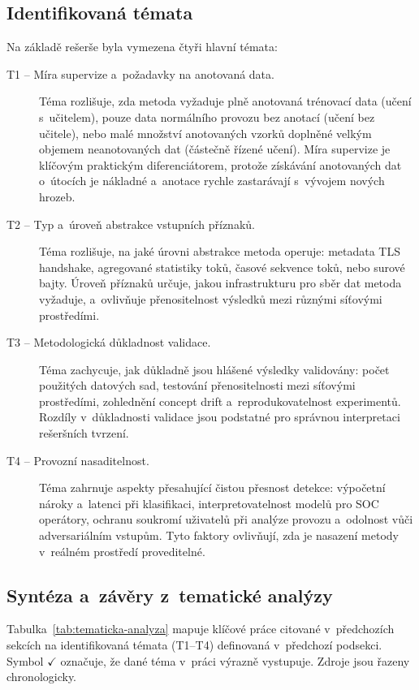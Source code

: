 \subsection{Identifikovaná témata}
\label{sec:ta-temata}

Na základě rešerše byla vymezena čtyři hlavní témata:

\begin{description}
\item[T1 -- Míra supervize a~požadavky na anotovaná data.] Téma rozlišuje, zda metoda vyžaduje plně anotovaná trénovací data (učení s~učitelem), pouze data normálního provozu bez anotací (učení bez učitele), nebo malé množství anotovaných vzorků doplněné velkým objemem neanotovaných dat (částečně řízené učení). Míra supervize je klíčovým praktickým diferenciátorem, protože získávání anotovaných dat o~útocích je nákladné a~anotace rychle zastarávají s~vývojem nových hrozeb.

\item[T2 -- Typ a~úroveň abstrakce vstupních příznaků.] Téma rozlišuje, na jaké úrovni abstrakce metoda operuje: metadata TLS handshake, agregované statistiky toků, časové sekvence toků, nebo surové bajty. Úroveň příznaků určuje, jakou infrastrukturu pro sběr dat metoda vyžaduje, a~ovlivňuje přenositelnost výsledků mezi různými síťovými prostředími.

\item[T3 -- Metodologická důkladnost validace.] Téma zachycuje, jak důkladně jsou hlášené výsledky validovány: počet použitých datových sad, testování přenositelnosti mezi síťovými prostředími, zohlednění concept drift a~reprodukovatelnost experimentů. Rozdíly v~důkladnosti validace jsou podstatné pro správnou interpretaci rešeršních tvrzení.

\item[T4 -- Provozní nasaditelnost.] Téma zahrnuje aspekty přesahující čistou přesnost detekce: výpočetní nároky a~latenci při klasifikaci, interpretovatelnost modelů pro SOC operátory, ochranu soukromí uživatelů při analýze provozu a~odolnost vůči adversariálním vstupům. Tyto faktory ovlivňují, zda je nasazení metody v~reálném prostředí proveditelné.
\end{description}

\subsection{Syntéza a~závěry z~tematické analýzy}
\label{sec:ta-synteza}

Tabulka~\ref{tab:tematicka-analyza} mapuje klíčové práce citované v~předchozích sekcích na identifikovaná témata (T1--T4) definovaná v~předchozí podsekci. Symbol $\checkmark$ označuje, že dané téma v~práci výrazně vystupuje. Zdroje jsou řazeny chronologicky.

